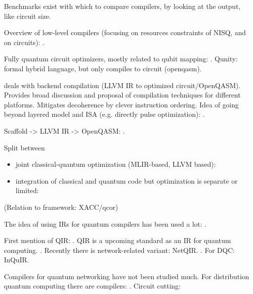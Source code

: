 Benchmarks exist with which to compare compilers, by looking at the output, like circuit size.


Overview of low-level compilers (focusing on resources constraints of NISQ, and on circuits): \cite{chong_programming_2017, murali_full-stack_2019, bandic_full-stack_2022}.

Fully quantum circuit optimizers, mostly related to qubit mapping: \cite{li_tackling_2019, zhang_context, bandic_mapping_2023, nishio_extracting_2020}.
Qunity: formal hybrid language, but only compiles to circuit (openqasm).

\cite{murali_noise-adaptive_2019} deals with backend compilation (LLVM IR to optimized circuit/OpenQASM).
\cite{murali_full-stack_2019} Provides broad discussion and proposal of compilation techniques for different platforms.
\cite{smith_error_2021} Mitigates decoherence by clever instruction ordering.
Idea of going beyond layered model and ISA (e.g. directly pulse optimization): \cite{shi_resource-efficient_2020}.

Scaffold -> LLVM IR -> OpenQASM: \cite{litteken_updated_2020}.


Split between
\begin{itemize}
\item joint classical-quantum optimization (MLIR-based, LLVM based): \cite{mccaskey_mlir_2021, ittah_enabling_2022, nguyen_retargetable_2022, peduri_qssa_2022}
\item integration of classical and quantum code but optimization is separate or limited: \cite{litteken_updated_2020, fux_quingo_2021, khalate_llvm-based_2022, younis_quantum_2022}
\end{itemize}

(Relation to framework: XACC/qcor)


The idea of using IRs for quantum compilers has been used a lot: \cite{nigam_compiler_2021, nishio_inquir_2023}.

First mention of QIR: \cite{haner_software_2018}.
QIR is a upcoming standard as an IR for quantum computing. \cite{geller_introducing_2020}.
Recently there is network-related variant: NetQIR. \cite{vazquez-perez_netqir_2024}.
For DQC: InQuIR.

Compilers for quantum networking have not been studied much.
For distribution quantum computing there are compilers: \cite{ferrari_compiler_2021, haner_distributed_2021, cuomo_optimized_2023, ferrari_modular_2023}.
Circuit cutting: \cite{chatterjee_qurzon_2022}



